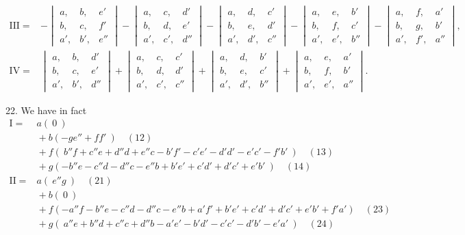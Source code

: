 \documentclass[11pt]{article}
\begin{document}
\[\begin{aligned}
\mathrm{III} = & -\begin{vmatrix} a, & b, & e'\\ b, & c, & f'\\ a', & b', & e'' \end{vmatrix} - \begin{vmatrix} a, & c, & d'\\ b, & d, & e'\\ a', & c', & d'' \end{vmatrix} - \begin{vmatrix} a, & d, & c'\\ b, & e, & d'\\ a', & d', & c'' \end{vmatrix} - \begin{vmatrix} a, & e, & b'\\ b, & f, & c'\\ a', & e', & b'' \end{vmatrix} - \begin{vmatrix} a, & f, & a'\\ b, & g, & b'\\ a', & f', & a'' \end{vmatrix},\\[6pt]
\mathrm{IV} = & \begin{vmatrix} a, & b, & d'\\ b, & c, & e'\\ a', & b', & d'' \end{vmatrix} + \begin{vmatrix} a, & c, & c'\\ b, & d, & d'\\ a', & c', & c'' \end{vmatrix} + \begin{vmatrix} a, & d, & b'\\ b, & e, & c'\\ a', & d', & b'' \end{vmatrix} + \begin{vmatrix} a, & e, & a'\\ b, & f, & b'\\ a', & e', & a'' \end{vmatrix}.
\end{aligned}
\]

\medskip

22. We have in fact
\[
\begin{array}{rl}
\mathrm{I} = & a(\ 0\ )\\
& {} + b(-ge'' + ff'\ )\quad (12)\\
& {} + f(\ b''f + c''e + d''d + e''c - b'f' - c'e' - d'd' - e'c' - f'b'\ )\quad (13)\\
& {} + g(-b''e - c''d - d''c - e''b + b'e' + c'd' + d'c' + e'b'\ )\quad (14)\\[4pt]
\mathrm{II} = & a(\ e''g\ )\quad (21)\\
& {} + b(\ 0\ )\\
& {} + f(-a''f - b''e - c''d - d''c - e''b + a'f' + b'e' + c'd' + d'c' + e'b' + f'a')\quad (23)\\
& {} + g(\ a''e + b''d + c''c + d''b - a'e' - b'd' - c'c' - d'b' - e'a'\ )\quad (24)
\end{array}
\]
\end{document}
